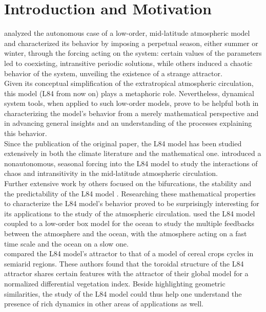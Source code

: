 \documentclass[%
 aip, cha,
 amsmath,amssymb,
 reprint,%
author-year,%
]{revtex4-1}
\newcommand{\0}{\mathbf 0}
\begin{document}
\section{Introduction and Motivation}
\label{sec:intro}


\citet{lorenz84} analyzed the autonomous case of a low-order, mid-latitude  atmospheric model and characterized its behavior by imposing a perpetual season, either summer or winter, through the forcing acting on the system: certain values of the parameters led to coexisting, intransitive periodic solutions, while others induced a chaotic behavior of the system, unveiling the existence of a strange attractor. \\
Given its conceptual simplification of the extratropical atmospheric circulation, this model (L84 from now on) plays a metaphoric role. Nevertheless, dynamical system tools, when applied to such low-order models, prove to be helpful both in characterizing the model's behavior from a merely mathematical perspective and in advancing general insights and an understanding of the processes explaining this behavior. \\ 
Since the publication of the original paper, the L84 model has been studied extensively in both the climate  literature and the mathematical one. \citet{lorenz90} introduced a nonautonomous, seasonal forcing into the L84 model to study the interactions of chaos and intransitivity in the mid-latitude atmospheric circulation. \\ 
Further extensive work by others focused on the bifurcations, the stability and the predictability of the L84 model \citep{shilnikov, Broer, freire2008multistability}. Researching these mathematical properties to characterize the L84 model's behavior proved to be surprisingly interesting for its applications to the study of the atmospheric circulation. \cite{vanveen2001} used the L84 model coupled to a low-order box model for the ocean to study the multiple feedbacks between the atmosphere and the ocean, with the atmosphere acting on a fast time scale and the ocean on a slow one.\\ 
\citet{mangiarotti} compared the L84 model's attractor to that of a model of cereal crops cycles in semiarid regions. 
These authors found that the toroidal structure of the L84 attractor shares certain features with the attractor of their global model for a normalized differential vegetation index. Beside highlighting geometric similarities, the study of the L84 model could thus help one understand the presence of rich dynamics in other areas of applications as well.\\
\end{document}
